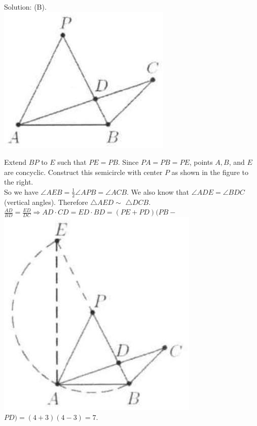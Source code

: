 \documentclass[10pt]{article}
\begin{document}
Solution: (B).\\
\includegraphics[max width=\textwidth, center]{2025_04_17_97bc1f7e44d93c271a88g-203}

Extend \(B P\) to \(E\) such that \(P E=P B\). Since \(P A=P B=P E\), points \(A, B\), and \(E\) are concyclic. Construct this semicircle with center \(P\) as shown in the figure to the right.\\
So we have \(\angle A E B=\frac{1}{2} \angle A P B=\angle A C B\). We also know that \(\angle A D E=\angle B D C\) (vertical angles). Therefore \(\triangle A E D \sim\) \(\triangle D C B\).\\
\(\frac{A D}{B D}=\frac{E D}{D C} \Rightarrow A D \cdot C D=E D \cdot B D=(P E+P D)(P B-\)\\
\includegraphics[max width=\textwidth]{2025_04_17_97bc1f7e44d93c271a88g-203(1)} \(P D)=(4+3)(4-3)=7\).
\end{document}
